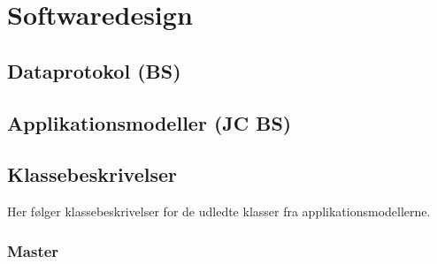\chapter{Softwaredesign}

\section{Dataprotokol (BS)}


\section{Applikationsmodeller (JC BS)}


\section{Klassebeskrivelser}
Her følger klassebeskrivelser for de udledte klasser fra applikationsmodellerne.

\subsection{Master}




